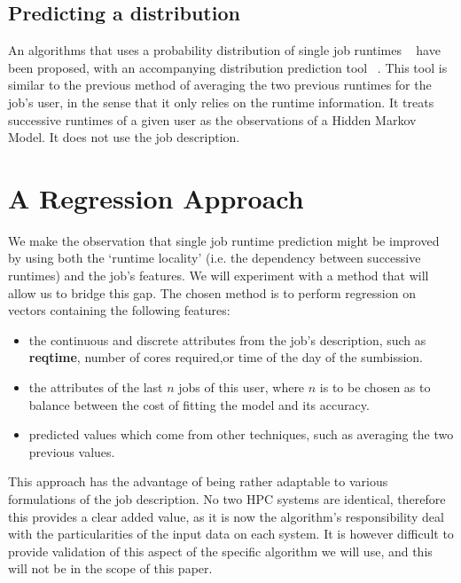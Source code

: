 \documentclass{article}
\begin{document}

\subsection{Predicting a distribution}
\label{sub:predicting_a_distribution}

An algorithms that uses a probability distribution of single job runtimes ~\cite{probabilistic-backfilling} have been proposed, with an accompanying distribution prediction tool ~\cite{hmm}. This tool is similar to the previous method of averaging the two previous runtimes for the job's user, in the sense that it only relies on the runtime information. It treats successive runtimes of a given user as the observations of a Hidden Markov Model. It does not use the job description.

\section{A Regression Approach}
\label{sec:our_approach}
We make the observation that single job runtime prediction might be improved by using both the `runtime locality' (i.e. the dependency between successive runtimes) and the job's features. We will experiment with a method that will allow us to bridge this gap.
The chosen method is to perform regression on vectors containing the following features:
\begin{itemize}
  \item the continuous and discrete attributes from the job's description, such as \textbf{reqtime}, number of cores required,or time of the day of the sumbission.
  \item the attributes of the last $n$ jobs of this user, where $n$ is to be chosen as to balance between the cost of fitting the model and its accuracy.
  \item predicted values which come from other techniques, such as averaging the two previous values.
\end{itemize}
This approach has the advantage of being rather adaptable to various formulations of the job description.
No two HPC systems are identical, therefore this provides a clear added value, as it is now the algorithm's responsibility deal with the particularities of the input data on each system.
It is however difficult to provide validation of this aspect of the specific algorithm we will use, and this will not be in the scope of this paper.
\end{document}
